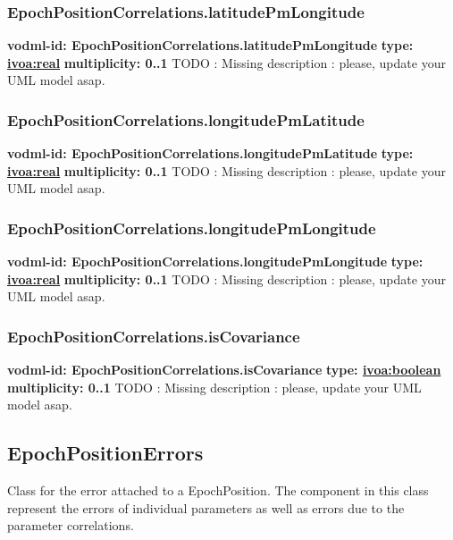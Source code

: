     \subsubsection{EpochPositionCorrelations.latitudePmLongitude}
      \textbf{vodml-id: EpochPositionCorrelations.latitudePmLongitude} \newline
      \textbf{type: \hyperref[sect:ivoa]{ivoa:real}} \newline
      \textbf{multiplicity: 0..1} \newline
      TODO : Missing description : please, update your UML model asap.

    \subsubsection{EpochPositionCorrelations.longitudePmLatitude}
      \textbf{vodml-id: EpochPositionCorrelations.longitudePmLatitude} \newline
      \textbf{type: \hyperref[sect:ivoa]{ivoa:real}} \newline
      \textbf{multiplicity: 0..1} \newline
      TODO : Missing description : please, update your UML model asap.

    \subsubsection{EpochPositionCorrelations.longitudePmLongitude}
      \textbf{vodml-id: EpochPositionCorrelations.longitudePmLongitude} \newline
      \textbf{type: \hyperref[sect:ivoa]{ivoa:real}} \newline
      \textbf{multiplicity: 0..1} \newline
      TODO : Missing description : please, update your UML model asap.

    \subsubsection{EpochPositionCorrelations.isCovariance}
      \textbf{vodml-id: EpochPositionCorrelations.isCovariance} \newline
      \textbf{type: \hyperref[sect:ivoa]{ivoa:boolean}} \newline
      \textbf{multiplicity: 0..1} \newline
      TODO : Missing description : please, update your UML model asap.

  \subsection{EpochPositionErrors}
  \label{sect:EpochPositionErrors}
    Class for the error attached to a EpochPosition. The component in this class represent the errors of individual parameters as well as errors due to the parameter correlations.


